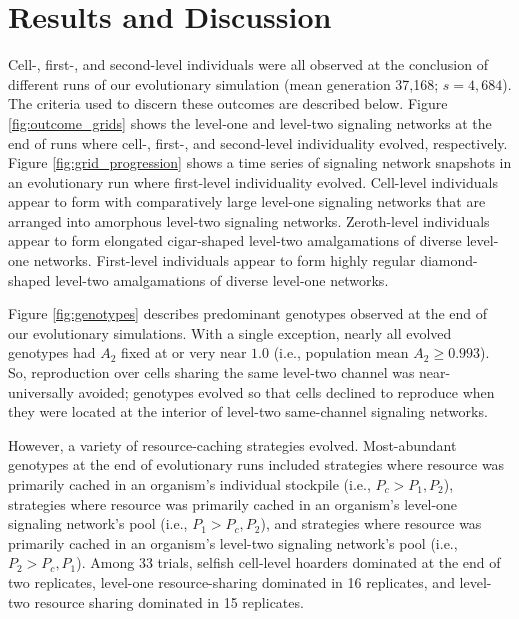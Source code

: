 \section{Results and Discussion}









Cell-, first-, and second-level individuals were all observed at the conclusion of different runs of our evolutionary simulation (mean generation 37,168; $s=4,684$).
The criteria used to discern these outcomes are described below.
Figure \ref{fig:outcome_grids} shows the level-one and level-two signaling networks at the end of runs where cell-, first-, and second-level individuality evolved, respectively.
Figure \ref{fig:grid_progression} shows a time series of signaling network snapshots in an evolutionary run where first-level individuality evolved.
Cell-level individuals appear to form with comparatively large level-one signaling networks that are arranged into amorphous level-two signaling networks.
Zeroth-level individuals appear to form elongated cigar-shaped level-two amalgamations of diverse level-one networks.
First-level individuals appear to form highly regular diamond-shaped level-two amalgamations of diverse level-one networks.

Figure \ref{fig:genotypes} describes predominant genotypes observed at the end of our evolutionary simulations.
With a single exception, nearly all evolved genotypes had $A_2$ fixed at or very near $1.0$ (i.e., population mean $A_2 \geq 0.993$).
So, reproduction over cells sharing the same level-two channel was near-universally avoided;
genotypes evolved so that cells declined to reproduce when they were located at the interior of level-two same-channel signaling networks.

However, a variety of resource-caching strategies evolved.
Most-abundant genotypes at the end of evolutionary runs included strategies where resource was primarily cached in an organism's individual stockpile (i.e., $P_{c} > P_1, P_2$), strategies where resource was primarily cached in an organism's level-one signaling network's pool (i.e., $P_1 > P_{c}, P_2$), and strategies where resource was primarily cached in an organism's level-two signaling network's pool (i.e., $P_2 > P_{c}, P_1$).
Among 33 trials, selfish cell-level hoarders dominated at the end of two replicates, level-one resource-sharing dominated in 16 replicates, and level-two resource sharing dominated in 15 replicates.

